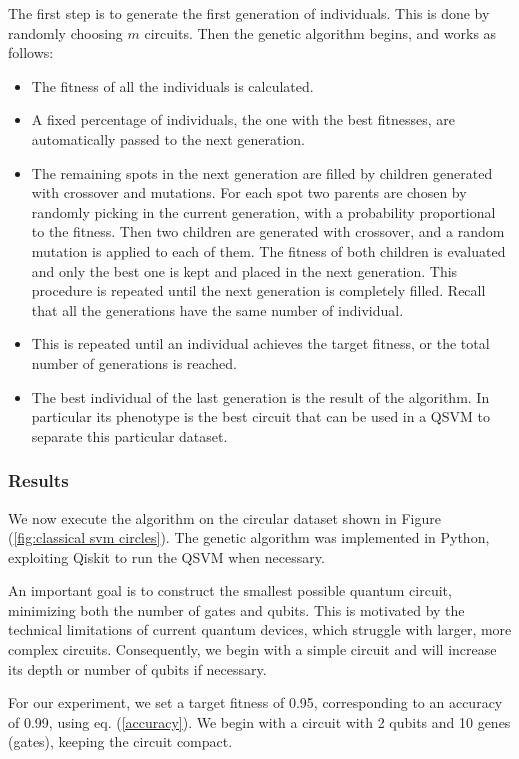\documentclass[12pt]{article}
\begin{document}
The first step is to generate the first generation of individuals. This is done by randomly choosing $m$ circuits. Then the genetic algorithm begins, and works as follows:
\begin{itemize}
    \item The fitness of all the individuals is calculated.
    \item A fixed percentage of individuals, the one with the best fitnesses, are automatically passed to the next generation. 
    \item The remaining spots in the next generation are filled by children generated with crossover and mutations. For each spot two parents are chosen by randomly picking in the current generation, with a probability proportional to the fitness. Then two children are generated with crossover, and a random mutation is applied to each of them. The fitness of both children is evaluated and only the best one is kept and placed in the next generation. This procedure is repeated until the next generation is completely filled. Recall that all the generations have the same number of individual.
    \item This is repeated until an individual achieves the target fitness, or the total number of generations is reached.
    \item The best individual of the last generation is the result of the algorithm. In particular its phenotype is the best circuit that can be used in a QSVM to separate this particular dataset. 
\end{itemize}


\subsubsection{Results}

We now execute the algorithm on the circular dataset shown in Figure (\ref{fig:classical svm circles}). The genetic algorithm was implemented in Python, exploiting Qiskit to run the QSVM when necessary.

An important goal is to construct the smallest possible quantum circuit, minimizing both the number of gates and qubits. This is motivated by the technical limitations of current quantum devices, which struggle with larger, more complex circuits. Consequently, we begin with a simple circuit and will increase its depth or number of qubits if necessary.

For our experiment, we set a target fitness of 0.95, corresponding to an accuracy of 0.99, using eq. (\ref{accuracy}). We begin with a circuit with 2 qubits and 10 genes (gates), keeping the circuit compact.
\end{document}
